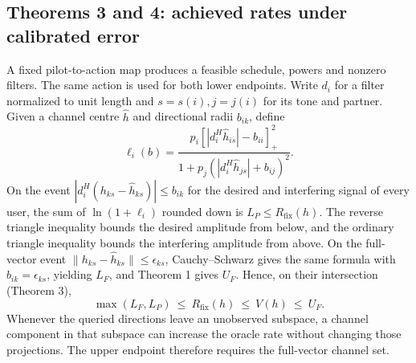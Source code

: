 \documentclass[lineno,pdflatex,sn-nature]{sn-jnl}
\begin{document}
\subsection*{Theorems 3 and 4: achieved rates under calibrated error}
A fixed pilot-to-action map produces a feasible schedule, powers and nonzero filters. The same action is used for both lower endpoints. Write \(d_i\) for a filter normalized to unit length and \(s=s(i),j=j(i)\) for its tone and partner. Given a channel centre \(\hat h\) and directional radii \(b_{ik}\), define
\[
 \ell_i(b)=\frac{p_i\left[|d_i^H\hat h_{is}|-b_{ii}\right]_{+}^2}
                 {1+p_j(|d_i^H\hat h_{js}|+b_{ij})^2}.
\]
On the event \(|d_i^H(h_{ks}-\hat h_{ks})|\leq b_{ik}\) for the desired and interfering signal of every user, the sum of \(\ln(1+\ell_i)\) rounded down is \(L_P\leq{R_{\mathrm{fix}}}(h)\). The reverse triangle inequality bounds the desired amplitude from below, and the ordinary triangle inequality bounds the interfering amplitude from above. On the full-vector event \(\|h_{ks}-\hat h_{ks}\|\leq\epsilon_{ks}\), Cauchy--Schwarz gives the same formula with \(b_{ik}=\epsilon_{ks}\), yielding \(L_F\), and Theorem 1 gives \(U_F\). Hence, on their intersection (Theorem 3),
\[
       \max(L_F,L_P)\ \leq\ {R_{\mathrm{fix}}}(h)\ \leq\ V(h)\ \leq\ U_F .
\]
Whenever the queried directions leave an unobserved subspace, a channel component in that subspace can increase the oracle rate without changing those projections. The upper endpoint therefore requires the full-vector channel set.
\end{document}
